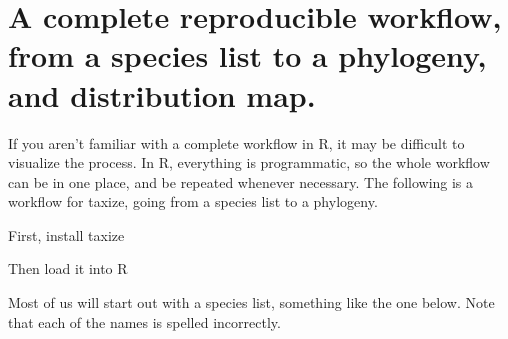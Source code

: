 
  
\section[A complete reproducible workflow]{A complete reproducible workflow, from a species list to a phylogeny, and distribution map.} 
\label{ap:taxize:one} 

If you aren't familiar with a complete workflow in R, it may be difficult to visualize the process. In R, everything is programmatic, so the whole workflow can be in one place, and be repeated whenever necessary. The following is a workflow for taxize, going from a species list to a phylogeny. 

First, install taxize

\begin{knitrout}
\color{fgcolor}\begin{kframe}
\begin{alltt}
\hlstd{(}\hlstd{)}
\end{alltt}
\end{kframe}
\end{knitrout}


Then load it into R

\begin{knitrout}
\color{fgcolor}\begin{kframe}
\begin{alltt}
\end{alltt}
\end{kframe}
\end{knitrout}


Most of us will start out with a species list, something like the one below. Note that each of the names is spelled incorrectly.

\begin{knitrout}
\color{fgcolor}\begin{kframe}
\begin{alltt}
 \hlkwb{<-} \hlstd{(}\hlstd{,} \hlstd{,} 
         \hlstd{,} \hlstd{,}
         \hlstd{,} \hlstd{,} \hlstd{)}
\end{alltt}
\end{kframe}
\end{knitrout}


